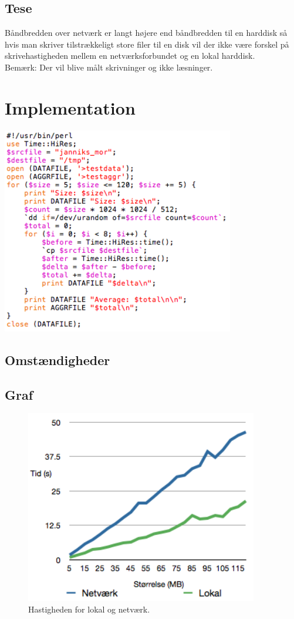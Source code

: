\documentclass{article}
\begin{document}
\subsection{Tese}
Båndbredden over netværk er langt højere end båndbredden til en harddisk så hvis man skriver tilstrækkeligt store filer til en disk vil der ikke være forskel på skrivehastigheden mellem en netværksforbundet og en lokal harddisk.\\
$$ $$
Bemærk: Der vil blive målt skrivninger og ikke læsninger.

\section{Implementation}

\includegraphics[width=4in]{kode.png}

\subsection{Omstændigheder}

\subsection{Graf}

\begin{figure}
	\includegraphics[width=4in]{ploto.png}
	\caption{Hastigheden for lokal og netværk.}
	\label{ploto}
\end{figure}
\end{document}
